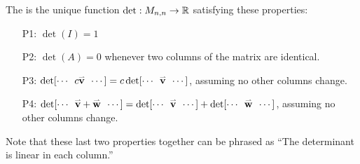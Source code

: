 \begin{definition}
The  is the unique function
\(\det:M_{n,n}\to\IR\) satisfying these  properties:
\begin{enumerate}
\item [P1:] \(\det(I)=1\)
\item [P2:] \(\det(A)=0\) whenever two columns of the matrix are identical.
\item[P3:]
\(\det[\cdots\hspace{0.5em}c\vec{v}\hspace{0.5em}\cdots]=
c\det[\cdots\hspace{0.5em}\vec{v}\hspace{0.5em}\cdots]\), assuming no other columns change.
\item[P4:]
\(\det[\cdots\hspace{0.5em}\vec{v}+\vec{w}\hspace{0.5em}\cdots]=
\det[\cdots\hspace{0.5em}\vec{v}\hspace{0.5em}\cdots]+
\det[\cdots\hspace{0.5em}\vec{w}\hspace{0.5em}\cdots]\), assuming no other columns change.
\end{enumerate}

\vspace{1em}

Note that these last two properties together can be phrased as ``The determinant is linear in each column.''

\end{definition}


